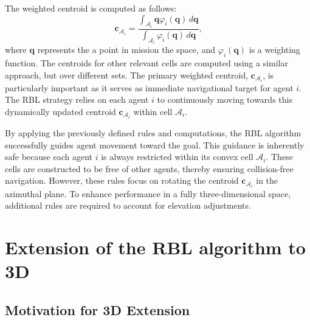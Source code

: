         The weighted centroid is computed as follows:        
        \begin{equation}
            \label{eqn:centroid_a}
            \mathbf{c}_{\mathcal{A}_i} = \frac{\int_{\mathcal{A}_i} \mathbf{q} \varphi_i(\mathbf{q}) \, d\mathbf{q}}{\int_{\mathcal{A}_i} \varphi_i(\mathbf{q}) \, d\mathbf{q}}\text{,}
        \end{equation}
        where \( \mathbf{q} \) represents the a point in mission the space, and \( \varphi_i(\mathbf{q}) \) is a weighting function. 
        The centroids for other relevant cells are computed using a similar approach, but over different sets.
        The primary weighted centroid, $\mathbf{c}_{\mathcal{A}_i}$, is particularly important as it serves as immediate navigational target for agent $i$.
        The \ac{RBL} strategy relies on each agent $i$ to continuously moving towards this dynamically updated centroid $\mathbf{c}_{\mathcal{A}_i}$ within cell $\mathcal{A}_i$.

        By applying the previously defined rules and computations, the RBL algorithm successfully guides agent movement toward the goal.
        This guidance is inherently safe because each agent $i$ is always restricted within its convex cell $\mathcal{A}_i$.
        These cells are constructed to be free of other agents, thereby ensuring collision-free navigation.
        However, these rules focus on rotating the centroid $\mathbf{c}_{\mathcal{A}_i}$ in the azimuthal plane. 
        To enhance performance in a fully three-dimensional space, additional rules are required to account for elevation adjustments. 

\section{Extension of the RBL algorithm to 3D}
    \subsection{Motivation for 3D Extension}

